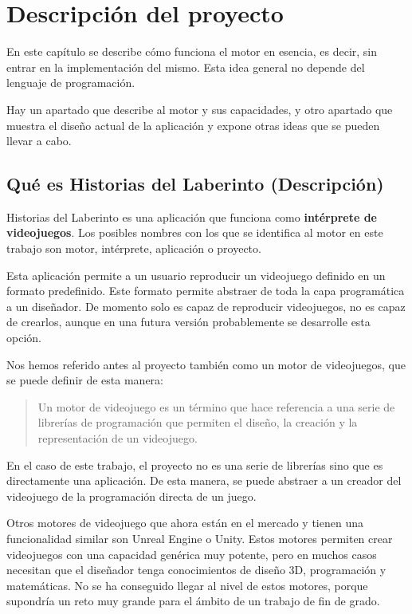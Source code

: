 \chapter{Descripción del proyecto}
En este capítulo se describe cómo funciona el motor en esencia, es decir, sin entrar en la implementación del mismo. Esta idea general no depende del lenguaje de programación.

Hay un apartado que describe al motor y sus capacidades, y otro apartado que muestra el diseño actual de la aplicación y expone otras ideas que se pueden llevar a cabo.

\section{Qué es Historias del Laberinto (Descripción)}
Historias del Laberinto es una aplicación que funciona como \textbf{intérprete de videojuegos}. Los posibles nombres con los que se identifica al motor en este trabajo son motor, intérprete, aplicación o proyecto.

Esta aplicación permite a un usuario reproducir un videojuego definido en un formato predefinido. Este formato permite abstraer de toda la capa programática a un diseñador.
De momento solo es capaz de reproducir videojuegos, no es capaz de crearlos, aunque en una futura versión probablemente se desarrolle esta opción.

Nos hemos referido antes al proyecto también como un motor de videojuegos, que se puede definir de esta manera:
\begin{quote}
	\small Un motor de videojuego es un término que hace referencia a una serie de librerías de programación que permiten el diseño, la creación y la representación de un videojuego. \cite{Alberto_Carrasco}
\end{quote}

En el caso de este trabajo, el proyecto no es una serie de librerías sino que es directamente una aplicación. De esta manera, se puede abstraer a un creador del videojuego de la programación directa de un juego.

Otros motores de videojuego que ahora están en el mercado y tienen una funcionalidad similar son Unreal Engine\cite{unrealEngineHomepage} o Unity\cite{unity3dHomepage}. Estos motores permiten crear videojuegos con una capacidad genérica muy potente, pero en muchos casos necesitan que el diseñador tenga conocimientos de diseño 3D, programación y matemáticas. No se ha conseguido llegar al nivel de estos motores, porque supondría un reto muy grande para el ámbito de un trabajo de fin de grado.

